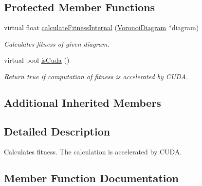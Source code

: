 \subsection*{Protected Member Functions}
\begin{DoxyCompactItemize}
\item 
virtual float \hyperlink{classlossycompressor_1_1_cuda_fitness_evaluator_a9b0422ff3cd37e1b33ad0fe4478609c1}{calculate\+Fitness\+Internal} (\hyperlink{structlossycompressor_1_1_voronoi_diagram}{Voronoi\+Diagram} $\ast$diagram)
\begin{DoxyCompactList}\small\item\em Calculates fitness of given diagram. \end{DoxyCompactList}\item 
virtual bool \hyperlink{classlossycompressor_1_1_cuda_fitness_evaluator_a71fe5eb07edc8518aa5c1a919d5e143f}{is\+Cuda} ()\hypertarget{classlossycompressor_1_1_cuda_fitness_evaluator_a71fe5eb07edc8518aa5c1a919d5e143f}{}\label{classlossycompressor_1_1_cuda_fitness_evaluator_a71fe5eb07edc8518aa5c1a919d5e143f}

\begin{DoxyCompactList}\small\item\em Return true if computation of fitness is accelerated by C\+U\+DA. \end{DoxyCompactList}\end{DoxyCompactItemize}
\subsection*{Additional Inherited Members}


\subsection{Detailed Description}
Calculates fitness. The calculation is accelerated by C\+U\+DA. 

\subsection{Member Function Documentation}
